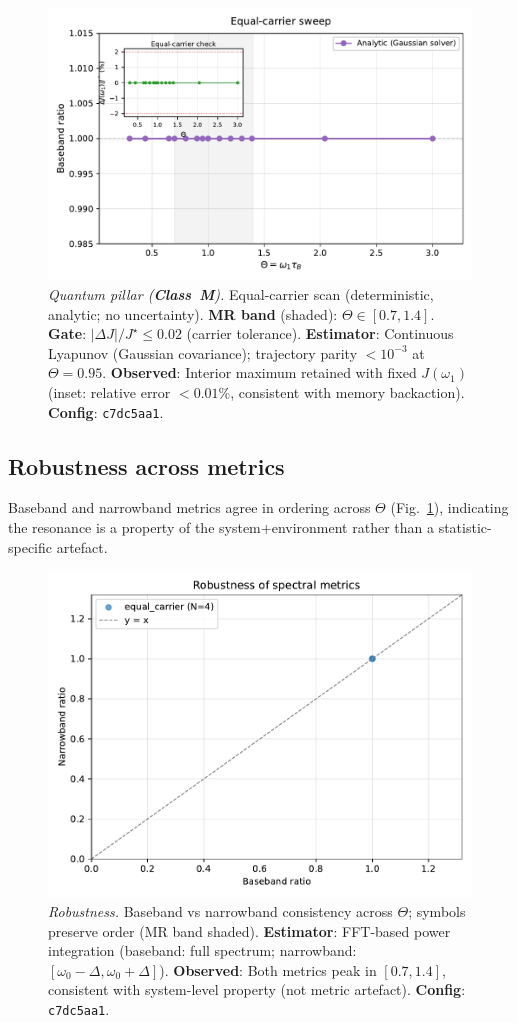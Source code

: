 \documentclass[11pt,letterpaper]{article}
\newcommand{\confighash}{c7dc5aa1}
\DeclareRobustCommand{\classM}{\textbf{Class~M}\xspace}
\begin{document}
\begin{figure}[t]
\centering
\includegraphics[width=0.8\linewidth]{figures/figB_equal_carrier.pdf}
\caption{\emph{Quantum pillar (\classM).} Equal-carrier scan (deterministic, analytic; no uncertainty). \textbf{MR band} (shaded): $\Theta\in[0.7,1.4]$. \textbf{Gate}: $|\Delta J|/J^\star\le 0.02$ (carrier tolerance). \textbf{Estimator}: Continuous Lyapunov (Gaussian covariance); trajectory parity $<10^{-3}$ at $\Theta=0.95$. \textbf{Observed}: Interior maximum retained with fixed $J(\omega_1)$ (inset: relative error $<0.01\%$, consistent with memory backaction). \textbf{Config}: \texttt{\confighash}.}
\end{figure}

\subsection{Robustness across metrics}
Baseband and narrowband metrics agree in ordering across $\Theta$ (Fig.~\ref{fig:robustness}), indicating the resonance is a property of the system+environment rather than a statistic-specific artefact.

\begin{figure}[h!]
\centering
\includegraphics[width=0.75\linewidth]{figures/figC_robustness.pdf}
\caption{\label{fig:robustness}\emph{Robustness.} Baseband vs narrowband consistency across $\Theta$; symbols preserve order (MR band shaded). \textbf{Estimator}: FFT-based power integration (baseband: full spectrum; narrowband: $[\omega_0-\Delta,\omega_0+\Delta]$). \textbf{Observed}: Both metrics peak in $[0.7,1.4]$, consistent with system-level property (not metric artefact). \textbf{Config}: \texttt{\confighash}.}
\end{figure}
\end{document}
